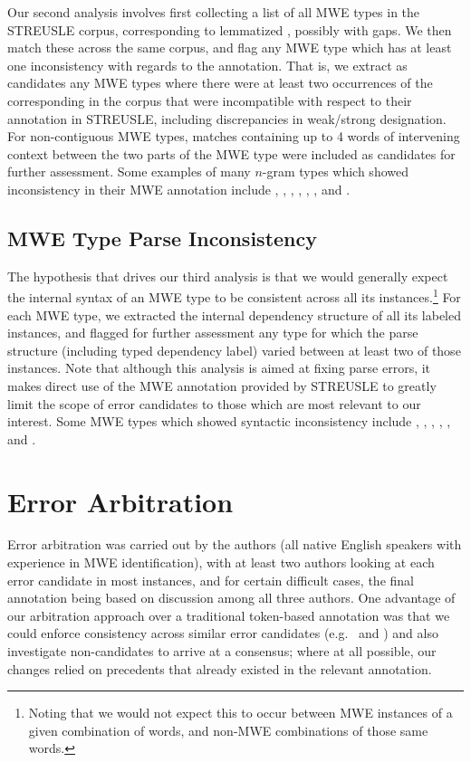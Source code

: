 \documentclass[output=paper
,modfonts
,nonflat]{langsci/langscibook}
\begin{document}
Our second analysis involves first collecting a list of all MWE types in the STREUSLE corpus, corresponding to lemmatized \ngram[s], possibly with gaps. We then match these \ngram[s] across the same corpus, and flag any MWE type which has at least one inconsistency with regards to the annotation. That is, we extract as candidates any MWE types where there were at least two occurrences of the corresponding \ngram in the corpus that were incompatible with respect to their annotation in STREUSLE, including discrepancies in weak/strong designation. For non-contiguous MWE types, matches containing up to 4 words of intervening context between the two parts of the MWE type were included as candidates for further assessment. Some examples of many $n$-gram types which showed inconsistency in their MWE annotation include , , , , , , and .

\subsection{MWE Type Parse Inconsistency}

The hypothesis that drives our third analysis is that we would generally expect the internal syntax of an MWE type to be consistent across all its instances.\footnote{Noting that we would not expect this to occur between MWE instances of a given combination of words, and non-MWE combinations of those same words.}  For each MWE type, we extracted the internal dependency structure of all its labeled instances, and flagged for further assessment any type for which the parse structure (including typed dependency label) varied between at least two of those instances. Note that although this analysis is aimed at fixing parse errors, it makes direct use of the MWE annotation provided by STREUSLE to greatly limit the scope of error candidates to those which are most relevant to our interest. Some MWE types which showed syntactic inconsistency include , , , , , and .


\section{Error Arbitration}

Error arbitration was carried out by the authors (all native English speakers with experience in MWE identification), with at least two authors looking at each error candidate in most instances, and for certain difficult cases, the final annotation being based on discussion among all three authors. One advantage of our arbitration approach over a traditional token-based annotation was that we could enforce consistency across similar error candidates (e.g.\  and ) and also investigate non-candidates to arrive at a consensus; where at all possible, our changes relied on precedents that already existed in the relevant annotation. 
\end{document}
